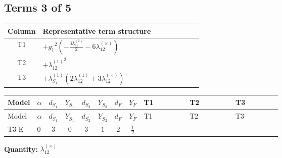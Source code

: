 \documentclass[8pt]{article}
\begin{document}
\begin{landscape}
\subsection*{Terms 3 of 5}
\begin{center}
\begin{tabular}{@{}c >{\raggedright\arraybackslash}p{0.82\linewidth}@{}}
\toprule
Column & Representative term structure \\
\midrule
T1 & \(\displaystyle +{g_1}^2 \left(-\frac{3 {\lambda_{12}^{(1)}}}{2}-6 {\lambda_{12}^{(\times)}}\right)\) \\
\midrule
T2 & \(\displaystyle +{\lambda_{12}^{(1)}}^2\) \\
\midrule
T3 & \(\displaystyle +{\lambda_{S_1}^{(1)}} (2 {\lambda_{12}^{(1)}}+3 {\lambda_{12}^{(\times)}})\) \\
\midrule
\bottomrule
\end{tabular}
\end{center}
\smallskip
\tiny
\begin{longtable}{@{}llcccccc >{\raggedright\arraybackslash}p{0.21\linewidth} >{\raggedright\arraybackslash}p{0.21\linewidth} >{\raggedright\arraybackslash}p{0.21\linewidth}@{}}
\toprule
Model & $\alpha$ & $d_{S_1}$ & $Y_{S_1}$ & $d_{S_2}$ & $Y_{S_2}$ & $d_F$ & $Y_F$ & T1 & T2 & T3 \\
\midrule
\endfirsthead
\toprule
Model & $\alpha$ & $d_{S_1}$ & $Y_{S_1}$ & $d_{S_2}$ & $Y_{S_2}$ & $d_F$ & $Y_F$ & T1 & T2 & T3 \\
\midrule
\endhead
T3-E & $0$ & $3$ & $0$ & $3$ & $1$ & $2$ & $\frac{1}{2}$ & \scriptsize\adjustbox{max width=\linewidth}{$\begin{gathered} +{g_1}^2 \left(-\frac{3 {\lambda_{12}^{(1)}}}{2}-6 {\lambda_{12}^{(\times)}}\right)\end{gathered}$} & \scriptsize\adjustbox{max width=\linewidth}{$\begin{gathered} +{\lambda_{12}^{(1)}}^2\end{gathered}$} & \scriptsize\adjustbox{max width=\linewidth}{$\begin{gathered} +{\lambda_{S_1}^{(1)}} (2 {\lambda_{12}^{(1)}}+3 {\lambda_{12}^{(\times)}})\end{gathered}$} \\
\midrule
\bottomrule
\end{longtable}
\clearpage
\noindent\textbf{Quantity: }$\lambda_{12}^{(\times)}$\par\smallskip

\end{landscape}
\end{document}
